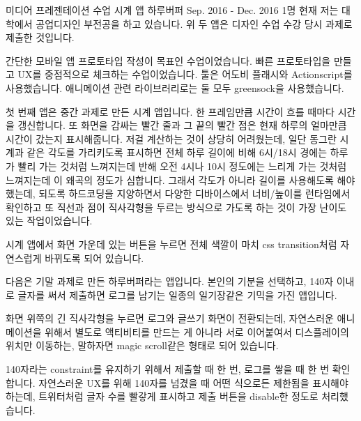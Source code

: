 \begin{cvprojects}
  	\clearpage
  \cvproject
     {미디어 프레젠테이션 수업 \href{https://github.com/palindrom615/flash-clock-app-demo}{\faGithubSquare}시계 앱
    \href{https://github.com/palindrom615/flash-clock-app-demo}{\faGithubSquare}하루버퍼} %
  	{Sep. 2016 - Dec. 2016} %
  	{1명} %
  	{
  	  현재 저는 대학에서 공업디자인 부전공을 하고 있습니다. 위 두 앱은 디자인 수업 수강 당시 과제로 제출한 것입니다.
  	} %
  	{
  		\begin{cvitems}
  		  \item{간단한 모바일 앱 프로토타입 작성이 목표인 수업이었습니다. 빠른 프로토타입을 만들고 UX를 중점적으로 체크하는 수업이었습니다. 툴은 어도비 플래시와 Actionscript를 사용했습니다. 애니메이션 관련 라이브러리로는 둘 모두 greensock을 사용했습니다.}
  		  \item{첫 번째 앱은 중간 과제로 만든 시계 앱입니다. 한 프레임만큼 시간이 흐를 때마다 시간을 갱신합니다. 또 화면을 감싸는 빨간 줄과 그 끝의 빨간 점은 현재 하루의 얼마만큼 시간이 갔는지 표시해줍니다. 저걸 계산하는 것이 상당히 어려웠는데, 일단 동그란 시계과 같은 각도를 가리키도록 표시하면 전체 하루 길이에 비해 6시/18시 경에는 하루가 빨리 가는 것처럼 느껴지는데 반해 오전 4시나 10시 정도에는 느리게 가는 것처럼 느껴지는데 이 왜곡의 정도가 심합니다. 그래서 각도가 아니라 길이를 사용해도록 해야 했는데, 되도록 하드코딩을 지양하면서 다양한 디바이스에서 너비/높이를 런타임에서 확인하고 또 직선과 점이 직사각형을 두르는 방식으로 가도록 하는 것이 가장 난이도 있는 작업이었습니다.}
  		  \item{시계 앱에서 화면 가운데 있는 버튼을 누르면 전체 색깔이 마치 css transition처럼 자연스럽게 바뀌도록 되어 있습니다.}
  		  \item{다음은 기말 과제로 만든 하루버퍼라는 앱입니다. 본인의 기분을 선택하고, 140자 이내로 글자를 써서 제출하면 로그를 남기는 일종의 일기장같은 기믹을 가진 앱입니다.}
  		  \item{화면 위쪽의 긴 직사각형을 누르면 로그와 글쓰기 화면이 전환되는데, 자연스러운 애니메이션을 위해서 별도로 액티비티를 만드는 게 아니라 서로 이어붙여서 디스플레이의 위치만 이동하는, 말하자면 magic scroll같은 형태로 되어 있습니다.}
  		  \item{140자라는 constraint를 유지하기 위해서 제출할 때 한 번, 로그를 쌓을 때 한 번 확인합니다. 자연스러운 UX를 위해 140자를 넘겼을 때 어떤 식으로든 제한됨을 표시해야 하는데, 트위터처럼 글자 수를 빨갛게 표시하고 제출 버튼을 disable한 정도로 처리했습니다.}
  		\end{cvitems}
  	} %
  	{} %

\end{cvprojects}
